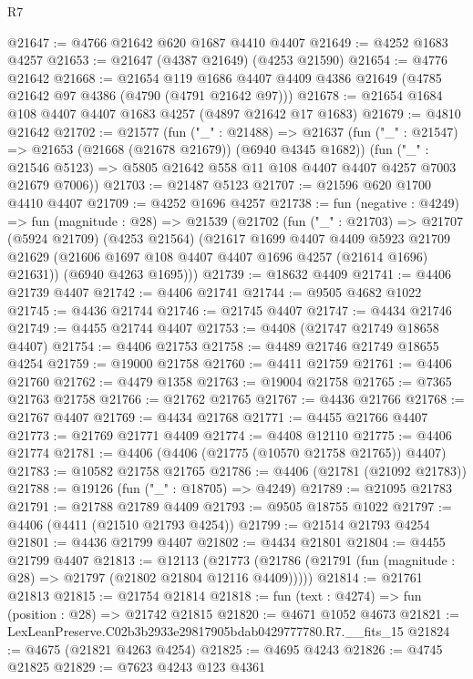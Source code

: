 \begin{lexlean}{R7}
\begin{coremodule}
@21647 := @4766 @21642 @620 @1687 @4410 @4407
@21649 := @4252 @1683 @4257
@21653 := @21647 (@4387 @21649) (@4253 @21590)
@21654 := @4776 @21642
@21668 := @21654
    @119
    @1686
    @4407
    @4409
    @4386
    @21649
    (@4785 @21642 @97 @4386 (@4790 (@4791 @21642 @97)))
@21678 := @21654 @1684 @108 @4407 @4407 @1683 @4257 (@4897 @21642 @17 @1683)
@21679 := @4810 @21642
@21702 := @21577
    (fun ("_" : @21488) =>
    @21637
      (fun ("_" : @21547) => @21653 (@21668 (@21678 @21679)) (@6940 @4345 @1682))
      (fun ("_" : @21546 @5123) => @5805 @21642 @558 @11 @108 @4407 @4407 @4257 @7003 @21679 @7006))
@21703 := @21487 @5123
@21707 := @21596 @620 @1700 @4410 @4407
@21709 := @4252 @1696 @4257
@21738 := fun (negative : @4249) =>
  fun (magnitude : @28) =>
  @21539
    (@21702
      (fun ("_" : @21703) =>
      @21707
        (@5924 @21709)
        (@4253 @21564)
        (@21617
          @1699
          @4407
          @4409
          @5923
          @21709
          @21629
          (@21606 @1697 @108 @4407 @4407 @1696 @4257 (@21614 @1696) @21631))
        (@6940 @4263 @1695)))
@21739 := @18632 @4409
@21741 := @4406 @21739 @4407
@21742 := @4406 @21741
@21744 := @9505 @4682 @1022
@21745 := @4436 @21744
@21746 := @21745 @4407
@21747 := @4434 @21746
@21749 := @4455 @21744 @4407
@21753 := @4408 (@21747 @21749 @18658 @4407)
@21754 := @4406 @21753
@21758 := @4489 @21746 @21749 @18655 @4254
@21759 := @19000 @21758
@21760 := @4411 @21759
@21761 := @4406 @21760
@21762 := @4479 @1358
@21763 := @19004 @21758
@21765 := @7365 @21763 @21758
@21766 := @21762 @21765
@21767 := @4436 @21766
@21768 := @21767 @4407
@21769 := @4434 @21768
@21771 := @4455 @21766 @4407
@21773 := @21769 @21771 @4409
@21774 := @4408 @12110
@21775 := @4406 @21774
@21781 := @4406 (@4406 (@21775 (@10570 @21758 @21765)) @4407)
@21783 := @10582 @21758 @21765
@21786 := @4406 (@21781 (@21092 @21783))
@21788 := @19126 (fun ("_" : @18705) => @4249)
@21789 := @21095 @21783
@21791 := @21788 @21789 @4409
@21793 := @9505 @18755 @1022
@21797 := @4406 (@4411 (@21510 @21793 @4254))
@21799 := @21514 @21793 @4254
@21801 := @4436 @21799 @4407
@21802 := @4434 @21801
@21804 := @4455 @21799 @4407
@21813 := @12113
    (@21773 (@21786 (@21791 (fun (magnitude : @28) => @21797 (@21802 @21804 @12116 @4409)))))
@21814 := @21761 @21813
@21815 := @21754 @21814
@21818 := fun (text : @4274) => fun (position : @28) => @21742 @21815
@21820 := @4671 @1052 @4673
@21821 := LexLeanPreserve.C02b3b2933e29817905bdab0429777780.R7.__fits_15
@21824 := @4675 (@21821 @4263 @4254)
@21825 := @4695 @4243
@21826 := @4745 @21825
@21829 := @7623 @4243 @123 @4361

\end{coremodule}
\end{lexlean}
